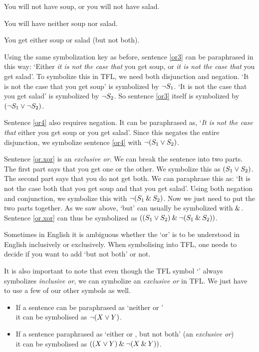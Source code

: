 	\begin{earg}
		\item[\ex{or3}] You will not have soup, or you will not have salad.
		\item[\ex{or4}] You will have neither soup nor salad.
		\item[\ex{or.xor}] You get either soup or salad (but not both).
	\end{earg}
Using the same symbolization key as before, sentence \ref{or3} can be paraphrased in this way: `Either \emph{it is not the case that} you get soup, or \emph{it is not the case that} you get salad'. To symbolize this in TFL, we need both disjunction and negation. `It is not the case that you get soup' is symbolized by $\neg S_1$. `It is not the case that you get salad' is symbolized by $\neg S_2$. So sentence \ref{or3} itself is symbolized by $(\neg S_1 \vee \neg S_2)$.

Sentence \ref{or4} also requires negation. It can be paraphrased as, `\emph{It is not the case that} either you get soup or you get salad'. Since this negates the entire disjunction, we symbolize sentence \ref{or4} with $\neg (S_1 \vee S_2)$.

Sentence \ref{or.xor} is an \emph{exclusive or}. We can break the sentence into two parts. The first part says that you get one or the other. We symbolize this as $(S_1 \vee S_2)$. The second part says that you do not get both. We can paraphrase this as: `It is not the case both that you get soup and that you get salad'. Using both negation and conjunction, we symbolize this with $\neg(S_1 \mathbin{\&} S_2)$. Now we just need to put the two parts together. As we saw above, `but' can usually be symbolized with $\mathbin{\&}$. Sentence \ref{or.xor} can thus be symbolized as $((S_1 \vee S_2) \mathbin{\&} \neg(S_1 \mathbin{\&} S_2))$.

Sometimes in English it is ambiguous whether the `or' is to be understood in English inclusively or exclusively. 
When symbolising into TFL, one needs to decide if you want to add `but not both' or not. 

It is also important to note that even though the TFL symbol `\eor' always symbolizes \emph{inclusive or}, we can symbolize an \emph{exclusive or} in {TFL}. We just have to use a few of our other symbols as well.

\begin{highlighted}
\begin{itemize}
\item If a sentence can be paraphrased as `neither \metaX or \metaY' \\it can be symbolised as $\neg(X\vee Y)$.
\item If a sentence paraphrased as `either \metaX or \metaY, but not both' (an \emph{exclusive or}) \\it can be symbolised as $((X \vee Y) \mathbin{\&} \neg(X \mathbin{\&} Y))$.
\end{itemize}
\end{highlighted}

